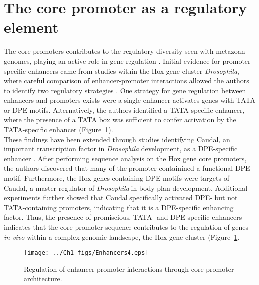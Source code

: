 \section{The core promoter as a regulatory element}

The core promoters contributes to the regulatory diversity seen with metazoan genomes, playing an active role in gene regulation \cite{Juven-Gershon_468}. Initial evidence for promoter specific enhancers came from studies within the Hox gene cluster \emph{Drosophila}, where careful comparison of enhancer-promoter interactions allowed the authors to identify two regulatory strategies \cite{Ohtsuki_2485}.  One strategy for gene regulation between enhancers and promoters exists were a single enhancer activates genes with TATA or DPE motifs.  Alternatively, the authors identified a TATA-specific enhancer, where the presence of a TATA box was sufficient to confer activation by the TATA-specific enhancer (Figure~\ref{fig:Enhancers}). \\
\indent These findings have been extended through studies identifying Caudal, an important transcription factor in \emph{Drosophila} development, as a DPE-specific enhancer \cite{Juven-Gershon_776}. After performing sequence analysis on the Hox gene core promoters, the authors discovered that many of the promoter containined a functional DPE motif.  Furthermore, the Hox genes containing DPE-motifs were targets of Caudal, a master regulator of \emph{Drosophila} in body plan development. Additional experiments further showed that Caudal specifically activated DPE- but not TATA-containing promoters, indicating that it is a DPE-specific enhancing factor. Thus, the presence of promiscious, TATA- and DPE-specific enhancers indicates that the core promoter sequence contributes to the regulation of genes \emph{in vivo} within a complex genomic landscape, the Hox gene cluster (Figure~\ref{fig:Enhancers}.\\ 
\begin{figure}
\centering
\texttt{[image: ../Ch1\_figs/Enhancers4.eps]}
\caption[Regulation of enhancer-promoter interactions through core promoter architecture]{Regulation of enhancer-promoter interactions through core promoter architecture.}
\label{fig:Enhancers}
\end{figure}
